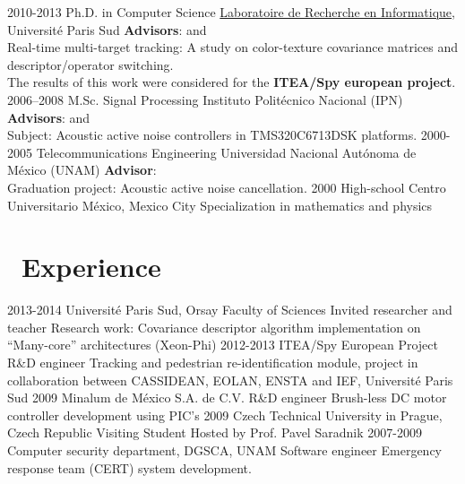 \documentclass[]{friggeri-cv}
\def\suitcase{{\FA \faSuitcase}}
\begin{document}
\begin{entrylist}
  \entry
    {2010-2013}
    {Ph.D. {\normalfont in Computer Science}}
    {\href{http://www.lri.fr}{Laboratoire de Recherche en Informatique}, Université Paris Sud}
    {\textbf{Advisors}: \href{https://www.lri.fr/~lacas/}{} and \href{http://m.i.c.h.e.l.e.free.fr/}{}\\
    Real-time multi-target tracking: A study on color-texture covariance matrices and descriptor/operator switching. \\
    The results of this work were considered for the \textbf{ITEA/Spy european project}.
    }
  \entry
    {2006–2008}
    {M.Sc. {\normalfont Signal Processing}}
    {Instituto Politécnico Nacional (IPN)}
    {
      \textbf{Advisors}:  and  \\
      Subject: Acoustic active noise controllers in TMS320C6713DSK platforms.
    }
  \entry
    {2000-2005}
    {Telecommunications Engineering}
    {Universidad Nacional Autónoma de México (UNAM)}
    {
      \textbf{Advisor}:  \\
      Graduation project: Acoustic active noise cancellation.
    }
  \entry
    {2000}
    {High-school}
    {Centro Universitario México, Mexico City}
    {Specialization in mathematics and physics}
\end{entrylist}

\section{{\suitcase}\ Experience}

\begin{entrylist}
  \entry
    {2013-2014}
    {Université Paris Sud, Orsay Faculty of Sciences}
    {Invited researcher and teacher}
    {Research work: Covariance descriptor algorithm implementation on \enquote{Many-core} architectures (Xeon-Phi)}
  \entry
    {2012-2013}
    {ITEA/Spy European Project}
    {R\&D engineer}
    {Tracking and pedestrian re-identification module, project in collaboration between CASSIDEAN, EOLAN, ENSTA and IEF, Université Paris Sud}
  \entry
    {2009}
    {Minalum de México S.A. de C.V.}
    {R\&D engineer}
    {Brush-less DC motor controller development using PIC's}
  \entry
    {2009}
    {Czech Technical University in Prague, Czech Republic}
    {Visiting Student}
    {Hosted by Prof. Pavel Saradnik}
  \entry
    {2007-2009}
    {Computer security department, DGSCA, UNAM}
    {Software engineer}
    {Emergency response team (CERT) system development.}
\end{entrylist}
\end{document}
